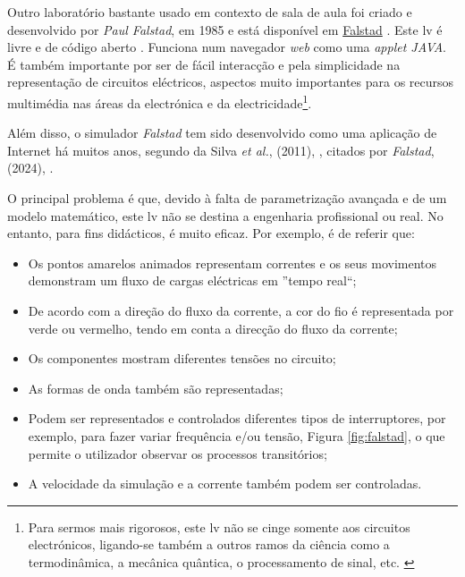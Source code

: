 Outro laboratório bastante usado em contexto de sala de aula foi criado e desenvolvido por \textit{Paul Falstad}, em 1985 e está disponível em \href{www.falstad.com}{Falstad} \cite{falstad}. Este \acrshort{lv} é livre e de código aberto \cite{falstadlicenca}. Funciona num navegador \textit{web} como uma \textit{applet JAVA}. É também importante por ser de fácil interacção e pela simplicidade na representação de circuitos eléctricos, aspectos muito importantes para os recursos multimédia nas áreas da electrónica e da electricidade\footnote{Para sermos mais rigorosos, este \acrshort{lv} não se cinge somente aos circuitos electrónicos, ligando-se também a outros ramos da ciência como a termodinâmica, a mecânica quântica, o processamento de sinal, etc. \cite{falstadcompleto}}.

Além disso, o simulador \textit{Falstad} tem sido desenvolvido como uma aplicação de Internet há muitos anos, segundo da Silva \textit{et al.}, (2011), \cite{RemoteTeachingElectricalCircuits}, citados por \textit{Falstad},(2024), \cite{falstad}.

O principal problema é que, devido à falta de parametrização avançada e de um modelo matemático, este \acrshort{lv} não se destina a engenharia profissional ou real. No entanto, para fins didácticos, é muito eficaz. Por exemplo, é de referir que:
\begin{itemize}
    \item Os pontos amarelos animados representam correntes e os seus movimentos demonstram um fluxo de cargas eléctricas em ''tempo real``;
    \item De acordo com a direção do fluxo da corrente, a cor do fio é representada por verde ou vermelho, tendo em conta a direcção do fluxo da corrente;
    \item Os componentes mostram diferentes tensões no circuito;
    \item As formas de onda também são representadas;
    \item Podem ser representados e controlados diferentes tipos de interruptores, por exemplo, para fazer variar frequência e/ou tensão, Figura \ref{fig:falstad}, o que permite o utilizador observar os processos transitórios;
    \item A velocidade da simulação e a corrente também podem ser controladas.
\end{itemize}

